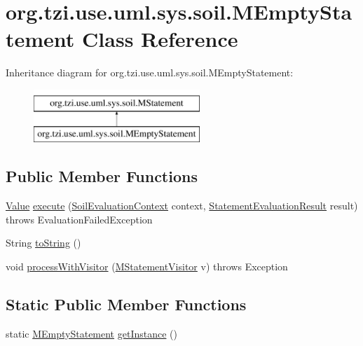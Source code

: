 \hypertarget{classorg_1_1tzi_1_1use_1_1uml_1_1sys_1_1soil_1_1_m_empty_statement}{\section{org.\-tzi.\-use.\-uml.\-sys.\-soil.\-M\-Empty\-Statement Class Reference}
\label{classorg_1_1tzi_1_1use_1_1uml_1_1sys_1_1soil_1_1_m_empty_statement}
}
Inheritance diagram for org.\-tzi.\-use.\-uml.\-sys.\-soil.\-M\-Empty\-Statement\-:\begin{figure}[H]
\begin{center}
\leavevmode
\includegraphics[height=2.000000cm]{classorg_1_1tzi_1_1use_1_1uml_1_1sys_1_1soil_1_1_m_empty_statement}
\end{center}
\end{figure}
\subsection*{Public Member Functions}
\begin{DoxyCompactItemize}
\item 
\hyperlink{classorg_1_1tzi_1_1use_1_1uml_1_1ocl_1_1value_1_1_value}{Value} \hyperlink{classorg_1_1tzi_1_1use_1_1uml_1_1sys_1_1soil_1_1_m_empty_statement_afb46b07cfed75dddc2b36dbe4052dfe7}{execute} (\hyperlink{classorg_1_1tzi_1_1use_1_1uml_1_1sys_1_1soil_1_1_soil_evaluation_context}{Soil\-Evaluation\-Context} context, \hyperlink{classorg_1_1tzi_1_1use_1_1uml_1_1sys_1_1_statement_evaluation_result}{Statement\-Evaluation\-Result} result)  throws Evaluation\-Failed\-Exception 
\item 
String \hyperlink{classorg_1_1tzi_1_1use_1_1uml_1_1sys_1_1soil_1_1_m_empty_statement_aa1bd7d57f1664a276c9c4e77eb2d97a8}{to\-String} ()
\item 
void \hyperlink{classorg_1_1tzi_1_1use_1_1uml_1_1sys_1_1soil_1_1_m_empty_statement_a967f8c0d3e166bb1a2810a052b81fd2f}{process\-With\-Visitor} (\hyperlink{interfaceorg_1_1tzi_1_1use_1_1uml_1_1sys_1_1soil_1_1_m_statement_visitor}{M\-Statement\-Visitor} v)  throws Exception 
\end{DoxyCompactItemize}
\subsection*{Static Public Member Functions}
\begin{DoxyCompactItemize}
\item 
static \hyperlink{classorg_1_1tzi_1_1use_1_1uml_1_1sys_1_1soil_1_1_m_empty_statement}{M\-Empty\-Statement} \hyperlink{classorg_1_1tzi_1_1use_1_1uml_1_1sys_1_1soil_1_1_m_empty_statement_a40c772b962fdcc78ce77b5c314d0e31e}{get\-Instance} ()
\end{DoxyCompactItemize}
